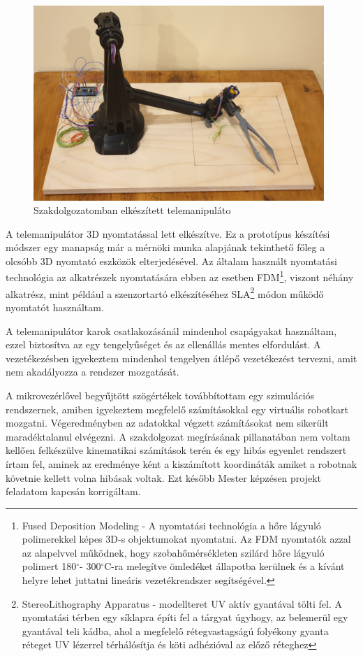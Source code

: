 \begin{figure}[!ht]
\centering
\includegraphics[width=110mm, keepaspectratio]{figures/Szakdoga/0_v_4_csipeszes}
\caption{Szakdolgozatomban elkészített telemanipuláto}
\label{fig:Szakdoga_csipeszes}
\end{figure}

A telemanipulátor 3D nyomtatással lett elkészítve. Ez a prototípus készítési módszer egy manapság már a mérnöki munka alapjának tekinthető főleg a olcsóbb 3D nyomtató eszközök elterjedésével. Az általam használt nyomtatási technológia az alkatrészek nyomtatására ebben az esetben FDM\footnote{Fused Deposition Modeling - A nyomtatási technológia a hőre lágyuló polimerekkel képes 3D-s objektumokat nyomtatni. Az FDM nyomtatók azzal az alapelvvel működnek, hogy szobahőmérsékleten szilárd hőre lágyuló polimert 180$^{\circ}$- 300$^{\circ}$C-ra melegítve ömledéket állapotba kerülnek és a kívánt helyre lehet juttatni lineáris vezetékrendszer segítségével.}, viszont néhány alkatrész, mint például a szenzortartó elkészítéséhez SLA\footnote{StereoLithography Apparatus - modellteret UV aktív gyantával tölti fel. A nyomtatási térben egy síklapra építi fel a tárgyat úgyhogy, az belemerül egy gyantával teli kádba, ahol a megfelelő rétegvastagságú folyékony gyanta réteget UV lézerrel térhálósítja és köti adhézióval az előző réteghez} módon működő nyomtatót használtam. 

A telemanipulátor karok csatlakozásánál mindenhol csapágyakat használtam, ezzel biztosítva az egy tengelyűséget és az ellenállás mentes elfordulást. A vezetékezésben igyekeztem mindenhol tengelyen átlépő vezetékezést tervezni, amit nem akadályozza a rendszer mozgatását.

A mikrovezérlővel begyűjtött szögértékek továbbítottam egy szimulációs rendszernek, amiben igyekeztem megfelelő számításokkal egy virtuális robotkart mozgatni. Végeredményben az adatokkal végzett számításokat nem sikerült maradéktalanul elvégezni. A szakdolgozat megírásának pillanatában nem voltam kellően felkészülve kinematikai számítások terén és egy hibás egyenlet rendszert írtam fel, aminek az eredménye ként a kiszámított koordináták amiket a robotnak követnie kellett volna hibásak voltak. Ezt később Mester képzésen projekt feladatom kapcsán korrigáltam.

